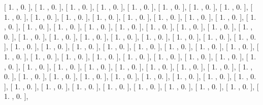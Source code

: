 \documentclass{article}
\begin{document}
       [ 1.        ,  0.        ],
       [ 1.        ,  0.        ],
       [ 1.        ,  0.        ],
       [ 1.        ,  0.        ],
       [ 1.        ,  0.        ],
       [ 1.        ,  0.        ],
       [ 1.        ,  0.        ],
       [ 1.        ,  0.        ],
       [ 1.        ,  0.        ],
       [ 1.        ,  0.        ],
       [ 1.        ,  0.        ],
       [ 1.        ,  0.        ],
       [ 1.        ,  0.        ],
       [ 1.        ,  0.        ],
       [ 1.        ,  0.        ],
       [ 1.        ,  0.        ],
       [ 1.        ,  0.        ],
       [ 1.        ,  0.        ],
       [ 1.        ,  0.        ],
       [ 1.        ,  0.        ],
       [ 1.        ,  0.        ],
       [ 1.        ,  0.        ],
       [ 1.        ,  0.        ],
       [ 1.        ,  0.        ],
       [ 1.        ,  0.        ],
       [ 1.        ,  0.        ],
       [ 1.        ,  0.        ],
       [ 1.        ,  0.        ],
       [ 1.        ,  0.        ],
       [ 1.        ,  0.        ],
       [ 1.        ,  0.        ],
       [ 1.        ,  0.        ],
       [ 1.        ,  0.        ],
       [ 1.        ,  0.        ],
       [ 1.        ,  0.        ],
       [ 1.        ,  0.        ],
       [ 1.        ,  0.        ],
       [ 1.        ,  0.        ],
       [ 1.        ,  0.        ],
       [ 1.        ,  0.        ],
       [ 1.        ,  0.        ],
       [ 1.        ,  0.        ],
       [ 1.        ,  0.        ],
       [ 1.        ,  0.        ],
       [ 1.        ,  0.        ],
       [ 1.        ,  0.        ],
       [ 1.        ,  0.        ],
       [ 1.        ,  0.        ],
       [ 1.        ,  0.        ],
       [ 1.        ,  0.        ],
       [ 1.        ,  0.        ],
       [ 1.        ,  0.        ],
       [ 1.        ,  0.        ],
       [ 1.        ,  0.        ],
       [ 1.        ,  0.        ],
       [ 1.        ,  0.        ],
       [ 1.        ,  0.        ],
       [ 1.        ,  0.        ],
       [ 1.        ,  0.        ],
       [ 1.        ,  0.        ],
       [ 1.        ,  0.        ],
       [ 1.        ,  0.        ],
       [ 1.        ,  0.        ],
       [ 1.        ,  0.        ],
       [ 1.        ,  0.        ],
       [ 1.        ,  0.        ],
       [ 1.        ,  0.        ],
       [ 1.        ,  0.        ],
       [ 1.        ,  0.        ],
       [ 1.        ,  0.        ],
       [ 1.        ,  0.        ],
       [ 1.        ,  0.        ],
       [ 1.        ,  0.        ],
       [ 1.        ,  0.        ],
       [ 1.        ,  0.        ],
\end{document}
